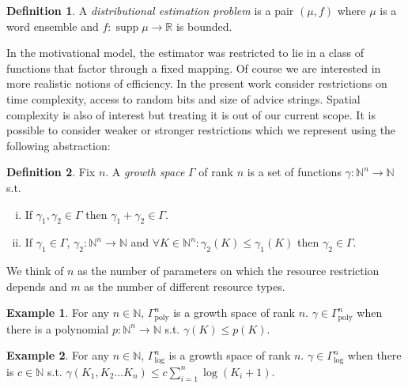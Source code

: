 \documentclass{article}
\theoremstyle{definition}
\newtheorem{definition}{Definition}[section]
\newtheorem{example}{Example}[section]
\theoremstyle{plain}
\DeclareMathOperator{\Supp}{supp}
\newcommand{\Nats}{\mathbb{N}}
\newcommand{\Reals}{\mathbb{R}}
\begin{document}
\begin{definition}

A \emph{distributional estimation problem} is a pair $(\mu,f)$ where $\mu$ is a word ensemble and $f: \Supp \mu \rightarrow \Reals$ is bounded.

\end{definition}

In the motivational model, the estimator was restricted to lie in a class of functions that factor through a fixed mapping. Of course we are interested in more realistic notions of efficiency. In the present work consider restrictions on time complexity, access to random bits and size of advice strings. Spatial complexity is also of interest but treating it is out of our current scope. It is possible to consider weaker or stronger restrictions which we represent using the following abstraction:

\begin{definition}

Fix $n$. A \emph{growth space} $\Gamma$ of rank $n$ is a set of functions $\gamma: \Nats^n \rightarrow \Nats$ s.t.

\begin{enumerate}[(i)]

\item If $\gamma_1, \gamma_2 \in \Gamma$ then $\gamma_1 + \gamma_2 \in \Gamma$.

\item If $\gamma_1 \in \Gamma$, $\gamma_2: \Nats^n \rightarrow \Nats$ and $\forall K \in \Nats^n: \gamma_2(K) \leq \gamma_1(K)$ then $\gamma_2 \in \Gamma$.

\end{enumerate}

We think of $n$ as the number of parameters on which the resource restriction depends and $m$ as the number of different resource types.

\end{definition}

\begin{example}

For any $n \in \Nats$, $\Gamma_{\text{poly}}^n$ is a growth space of rank $n$. $\gamma \in \Gamma_{\text{poly}}^n$ when there is a polynomial $p: \Nats^n \rightarrow \Nats$ s.t. $\gamma(K) \leq p(K)$.

\end{example}

\begin{example}

For any $n \in \Nats$, $\Gamma_{\text{log}}^n$ is a growth space of rank $n$. $\gamma \in \Gamma_{\text{log}}^n$ when there is $c \in \Nats$ s.t. $\gamma(K_1, K_2 \ldots K_n) \leq c \sum_{i=1}^n \log(K_i+1)$.

\end{example}
\end{document}

